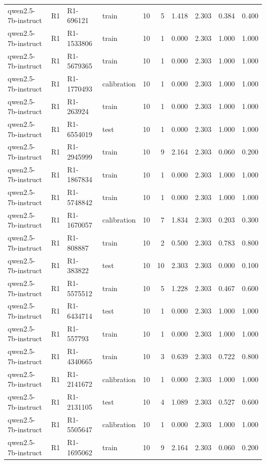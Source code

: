 \begin{table}
\begin{tabular}{llllrrrrrr}
qwen2.5-7b-instruct & R1 & R1-696121 & train & 10 & 5 & 1.418 & 2.303 & 0.384 & 0.400 \\
qwen2.5-7b-instruct & R1 & R1-1533806 & train & 10 & 1 & 0.000 & 2.303 & 1.000 & 1.000 \\
qwen2.5-7b-instruct & R1 & R1-5679365 & train & 10 & 1 & 0.000 & 2.303 & 1.000 & 1.000 \\
qwen2.5-7b-instruct & R1 & R1-1770493 & calibration & 10 & 1 & 0.000 & 2.303 & 1.000 & 1.000 \\
qwen2.5-7b-instruct & R1 & R1-263924 & train & 10 & 1 & 0.000 & 2.303 & 1.000 & 1.000 \\
qwen2.5-7b-instruct & R1 & R1-6554019 & test & 10 & 1 & 0.000 & 2.303 & 1.000 & 1.000 \\
qwen2.5-7b-instruct & R1 & R1-2945999 & train & 10 & 9 & 2.164 & 2.303 & 0.060 & 0.200 \\
qwen2.5-7b-instruct & R1 & R1-1867834 & train & 10 & 1 & 0.000 & 2.303 & 1.000 & 1.000 \\
qwen2.5-7b-instruct & R1 & R1-5748842 & train & 10 & 1 & 0.000 & 2.303 & 1.000 & 1.000 \\
qwen2.5-7b-instruct & R1 & R1-1670057 & calibration & 10 & 7 & 1.834 & 2.303 & 0.203 & 0.300 \\
qwen2.5-7b-instruct & R1 & R1-808887 & train & 10 & 2 & 0.500 & 2.303 & 0.783 & 0.800 \\
qwen2.5-7b-instruct & R1 & R1-383822 & test & 10 & 10 & 2.303 & 2.303 & 0.000 & 0.100 \\
qwen2.5-7b-instruct & R1 & R1-5575512 & train & 10 & 5 & 1.228 & 2.303 & 0.467 & 0.600 \\
qwen2.5-7b-instruct & R1 & R1-6434714 & test & 10 & 1 & 0.000 & 2.303 & 1.000 & 1.000 \\
qwen2.5-7b-instruct & R1 & R1-557793 & train & 10 & 1 & 0.000 & 2.303 & 1.000 & 1.000 \\
qwen2.5-7b-instruct & R1 & R1-4340665 & train & 10 & 3 & 0.639 & 2.303 & 0.722 & 0.800 \\
qwen2.5-7b-instruct & R1 & R1-2141672 & calibration & 10 & 1 & 0.000 & 2.303 & 1.000 & 1.000 \\
qwen2.5-7b-instruct & R1 & R1-2131105 & test & 10 & 4 & 1.089 & 2.303 & 0.527 & 0.600 \\
qwen2.5-7b-instruct & R1 & R1-5505647 & calibration & 10 & 1 & 0.000 & 2.303 & 1.000 & 1.000 \\
qwen2.5-7b-instruct & R1 & R1-1695062 & train & 10 & 9 & 2.164 & 2.303 & 0.060 & 0.200 \\

\end{tabular}
\end{table}
